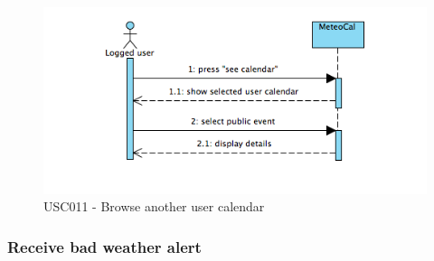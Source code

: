 \documentclass[10pt,a4paper,titlepage]{article}
\begin{document}
\begin{figure}[h]
\centering
\includegraphics[width=\linewidth]{./Sequence_diag/USC011.png}
\caption[USC011]{USC011 - Browse another user calendar}
\label{fig:USC011}
\end{figure}

\clearpage
\subsubsection{Receive bad weather alert} 
\end{document}
